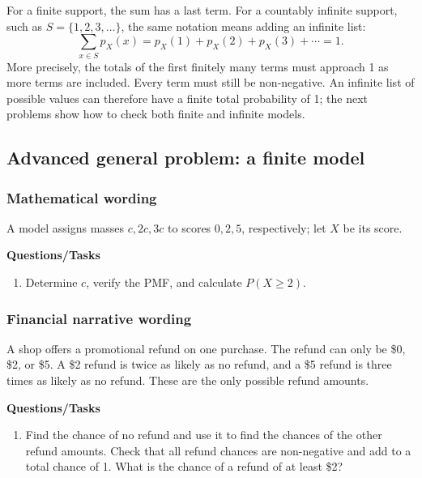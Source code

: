 For a finite support, the sum has a last term. For a countably infinite support, such as $S=\{1,2,3,\ldots\}$, the same notation means adding an infinite list:
\[
\sum_{x\in S}p_X(x)=p_X(1)+p_X(2)+p_X(3)+\cdots=1.
\]
More precisely, the totals of the first finitely many terms must approach 1 as more terms are included. Every term must still be non-negative. An infinite list of possible values can therefore have a finite total probability of 1; the next problems show how to check both finite and infinite models.
\subsection{Advanced general problem: a finite model}
\subsubsection*{Mathematical wording}
A model assigns masses $c,2c,3c$ to scores $0,2,5$, respectively; let $X$ be its score.

\textbf{Questions/Tasks}
\begin{enumerate}
\item Determine $c$, verify the PMF, and calculate $P(X\geq2)$.
\end{enumerate}
\subsubsection*{Financial narrative wording}
A shop offers a promotional refund on one purchase. The refund can only be \$0, \$2, or \$5. A \$2 refund is twice as likely as no refund, and a \$5 refund is three times as likely as no refund. These are the only possible refund amounts.

\textbf{Questions/Tasks}
\begin{enumerate}
\item Find the chance of no refund and use it to find the chances of the other refund amounts. Check that all refund chances are non-negative and add to a total chance of 1. What is the chance of a refund of at least \$2?
\end{enumerate}
